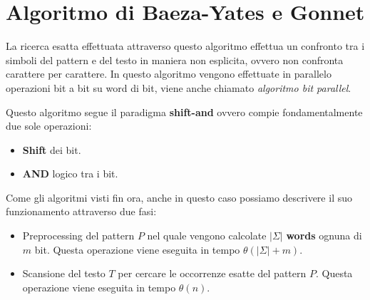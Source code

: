 \section{Algoritmo di Baeza-Yates e Gonnet}
La ricerca esatta effettuata attraverso questo algoritmo effettua un confronto tra i simboli del pattern e del testo in maniera non esplicita, ovvero non confronta carattere per carattere. In questo algoritmo vengono effettuate in parallelo operazioni bit a bit su word di bit, viene anche chiamato \textit{algoritmo bit parallel}.

Questo algoritmo segue il paradigma \textbf{shift-and} ovvero compie fondamentalmente due sole operazioni:
\begin{itemize}
    \item \textbf{Shift} dei bit.
    \item \textbf{AND} logico tra i bit.
\end{itemize}
Come gli algoritmi visti fin ora, anche in questo caso possiamo descrivere il suo funzionamento attraverso due fasi:
\begin{itemize}
    \item Preprocessing del pattern $P$ nel quale vengono calcolate $|\Sigma|$ \textbf{words} ognuna di $m$ bit. Questa operazione viene eseguita in tempo $\theta(|\Sigma| + m)$.
    \item Scansione del testo $T$ per cercare le occorrenze esatte del pattern $P$. Questa operazione viene eseguita in tempo $\theta(n)$.
\end{itemize}
